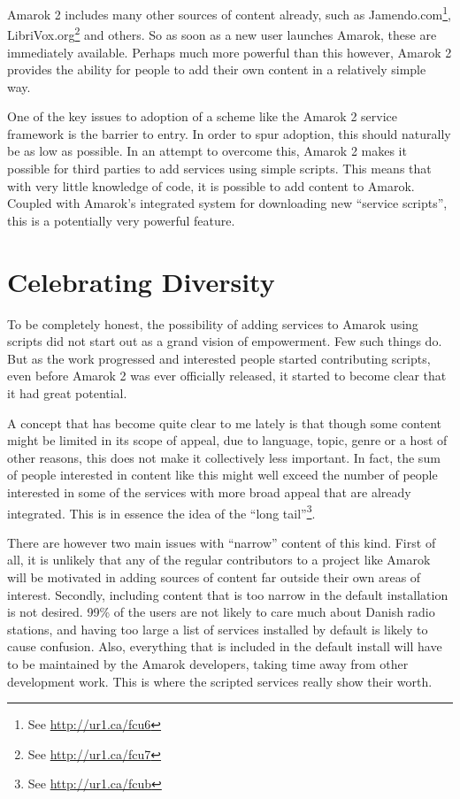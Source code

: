 Amarok 2 includes many other sources of content already, such as
Jamendo.com\footnote{See \url{http://ur1.ca/fcu6}},
LibriVox.org\footnote{See \url{http://ur1.ca/fcu7}} and others. So as soon as a new
user launches Amarok, these are immediately available. Perhaps much more
powerful than this however, Amarok 2 provides the ability for people to add
their own content in a relatively simple way.

One of the key issues to adoption of a scheme like the Amarok 2 service
framework is the barrier to entry. In order to spur adoption, this should
naturally be as low as possible. In an attempt to overcome this, Amarok 2 makes
it possible for third parties to add services using simple scripts. This means
that with very little knowledge of code, it is possible to add content to
Amarok. Coupled with Amarok's integrated system for downloading new ``service
scripts'', this is a potentially very powerful feature.


\section{Celebrating Diversity}
\label{s:consumer_to_creator:diversity}

To be completely honest, the possibility of adding services to Amarok using
scripts did not start out as a grand vision of empowerment. Few such things do.
But as the work progressed and interested people started contributing scripts,
even before Amarok 2 was ever of\hbox{}f\hbox{}icially released, it started to
become clear that it had great potential.

A concept that has become quite clear to me lately is that though some content
might be limited in its scope of appeal, due to language, topic, genre or a host
of other reasons, this does not make it collectively less important. In fact,
the sum of people interested in content like this might well exceed the number
of people interested in some of the services with more broad appeal that are
already integrated. This is in essence the idea of the ``long
tail''\footnote{See \url{http://ur1.ca/fcub}}.

There are however two main issues with ``narrow'' content of this kind.
F\hbox{}irst of all, it is unlikely that any of the regular contributors to a
project like Amarok will be motivated in adding sources of content far outside
their own areas of interest. Secondly, including content that is too narrow in
the default installation is not desired. 99\% of the users are not likely to
care much about Danish radio stations, and having too large a list of services
installed by default is likely to cause confusion. Also, everything that is
included in the default install will have to be maintained by the Amarok
developers, taking time away from other development work. This is where the
scripted services really show their worth.

